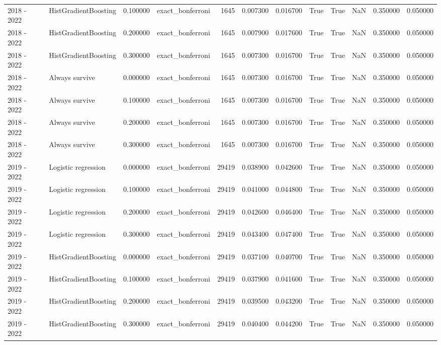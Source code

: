 \begin{tabular}{llrlrrrrrrrr}
2018 - 2022 & HistGradientBoosting & 0.100000 & exact_bonferroni & 1645 & 0.007300 & 0.016700 & True & True & NaN & 0.350000 & 0.050000 \\
2018 - 2022 & HistGradientBoosting & 0.200000 & exact_bonferroni & 1645 & 0.007900 & 0.017600 & True & True & NaN & 0.350000 & 0.050000 \\
2018 - 2022 & HistGradientBoosting & 0.300000 & exact_bonferroni & 1645 & 0.007300 & 0.016700 & True & True & NaN & 0.350000 & 0.050000 \\
2018 - 2022 & Always survive & 0.000000 & exact_bonferroni & 1645 & 0.007300 & 0.016700 & True & True & NaN & 0.350000 & 0.050000 \\
2018 - 2022 & Always survive & 0.100000 & exact_bonferroni & 1645 & 0.007300 & 0.016700 & True & True & NaN & 0.350000 & 0.050000 \\
2018 - 2022 & Always survive & 0.200000 & exact_bonferroni & 1645 & 0.007300 & 0.016700 & True & True & NaN & 0.350000 & 0.050000 \\
2018 - 2022 & Always survive & 0.300000 & exact_bonferroni & 1645 & 0.007300 & 0.016700 & True & True & NaN & 0.350000 & 0.050000 \\
2019 - 2022 & Logistic regression & 0.000000 & exact_bonferroni & 29419 & 0.038900 & 0.042600 & True & True & NaN & 0.350000 & 0.050000 \\
2019 - 2022 & Logistic regression & 0.100000 & exact_bonferroni & 29419 & 0.041000 & 0.044800 & True & True & NaN & 0.350000 & 0.050000 \\
2019 - 2022 & Logistic regression & 0.200000 & exact_bonferroni & 29419 & 0.042600 & 0.046400 & True & True & NaN & 0.350000 & 0.050000 \\
2019 - 2022 & Logistic regression & 0.300000 & exact_bonferroni & 29419 & 0.043400 & 0.047400 & True & True & NaN & 0.350000 & 0.050000 \\
2019 - 2022 & HistGradientBoosting & 0.000000 & exact_bonferroni & 29419 & 0.037100 & 0.040700 & True & True & NaN & 0.350000 & 0.050000 \\
2019 - 2022 & HistGradientBoosting & 0.100000 & exact_bonferroni & 29419 & 0.037900 & 0.041600 & True & True & NaN & 0.350000 & 0.050000 \\
2019 - 2022 & HistGradientBoosting & 0.200000 & exact_bonferroni & 29419 & 0.039500 & 0.043200 & True & True & NaN & 0.350000 & 0.050000 \\
2019 - 2022 & HistGradientBoosting & 0.300000 & exact_bonferroni & 29419 & 0.040400 & 0.044200 & True & True & NaN & 0.350000 & 0.050000 \\

\end{tabular}
